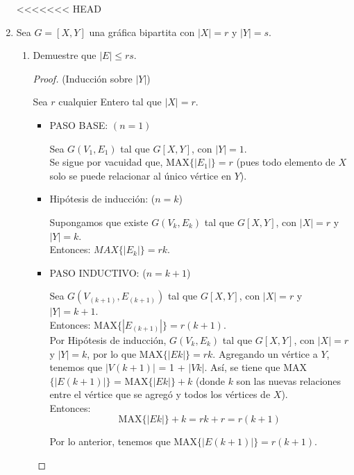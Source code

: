 \documentclass{article}
\begin{document}
\begin{enumerate}
<<<<<<< HEAD
  \item Sea $G = [X, Y]$ una gr\'afica bipartita con $|X| = r$ y $|Y| = s$.

    \begin{enumerate}
      \item Demuestre que $|E| \le rs$.
        \begin{proof}
          (Inducción sobre $|Y|$)

          Sea $r$ cualquier Entero tal que $|X|=r$.
          \begin{itemize}
            \item PASO BASE: $(n = 1)$

              Sea $G(V_1, E_1)$ tal que $G[X,Y]$, con $|Y|=1$. \\
              Se sigue por vacuidad que, MAX$\{|E_1|\}=r$ (pues todo elemento de $X$ solo se puede relacionar al \'unico v\'ertice en $Y$). \\

            \item Hip\'otesis de inducci\'on: ($n = k$)

              Supongamos que existe $G(V_k, E_k)$ tal que $G[X,Y]$, con $|X|=r$ y $|Y|= k$. \\ Entonces: $MAX\{|E_k|\} = rk$. \\

            \item PASO INDUCTIVO: ($n=k+1$)

              Sea $G(V_{(k+1)}, E_{(k+1)})$ tal que $G[X,Y]$, con $|X|=r$ y $|Y|=k+1$. \\
              Entonces: MAX$\{|E_{(k+1)}|\} = r(k+1)$. \\

              Por Hip\'otesis de inducci\'on, $G(V_k, E_k)$ tal que $G[X,Y]$, con $|X|=r$ y $|Y|=k$,
              por lo que MAX$\{|Ek|\}=rk$. Agregando un v\'ertice a $Y$, tenemos que $|V(k+1)|$ = 1 + $|Vk|$. As\'i, se tiene que MAX$\{|E(k+1)|\}$ = MAX$\{|Ek|\} + k$ (donde $k$ son las nuevas relaciones entre el v\'ertice que se agreg\'o y todos los v\'ertices de $X$). \\
              Entonces:
              $$\text{MAX}\{|Ek|\} + k = rk + r = r(k+1)$$

              Por lo anterior, tenemos que MAX$\{|E(k+1)|\} = r(k+1)$.
          \end{itemize}


\end{proof}
\end{enumerate}
\end{enumerate}
\end{document}
